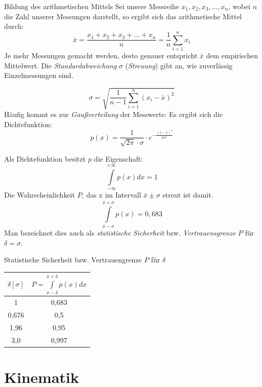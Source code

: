 \documentclass[a4paper,10pt]{scrartcl}
\begin{document}
\begin{seg}{Bildung des arithmetischen Mittels}
Sei unsere Messreihe $x_1, x_2, x_3, ..., x_n$, wobei $n$ die Zahl unserer Messungen darstellt, so ergibt sich das arithmetische Mittel durch:
\[
\boxed{\bar x = \frac{x_1+x_2+x_3+...+x_n}n=\frac{1}{n} \sum_{i=1}^{n} x_i}
\]
Je mehr Messungen gemacht werden, desto genauer entspricht $\bar x$ dem empirischen Mittelwert.  Die \emph{Standardabweichung} $\sigma$ (\emph{Streuung}) gibt an, wie zuverlässig Einzelmessungen sind.
\begin{figure}[h]
\end{figure}
\[
\boxed{\sigma=\sqrt{\frac 1 {n-1} \sum\limits_{i=1}^n (x_i-\bar x)^2}}
\]
Häufig kommt es zur \emph{Gaußverteilung} der Messwerte: Es ergibt sich die Dichtefunktion:
\[
\boxed{p(x)=\frac{1}{\sqrt{2\pi}\cdot \sigma} \cdot e^{-\frac{(x-\bar x)^2}{2\sigma^2}}}
\]
\begin{figure}[h]
\end{figure}
Als Dichtefunktion besitzt $p$ die Eigenschaft: 
\[
\int\limits_{-\infty}^{+\infty}p(x) dx = 1
\]
Die Wahrscheinlichkeit $P$, das x im Intervall $\bar x \pm \sigma$ streut ist damit. 
\[
\int\limits_{\bar x-\sigma}^{\bar x+\sigma} p(x)=0,683
\]
Man bezeichnet dies auch als \emph{statistische Sicherheit} bzw. \emph{Vertrauensgrenze} $P$ für $\delta=\sigma$.

\begin{seg}{Statistische Sicherheit bzw. Vertrauengrenze $P$ für $\delta$}
\begin{table}[h]
\begin{tabular}{c|c}
$\delta[\sigma]$ & $P=\int\limits_{\bar x-\delta}^{\bar x+\delta} p(x) dx$ \\ \hline
1 & 0,683 \\
0,676 & 0,5 \\
1,96 & 0,95 \\
3,0 & 0,997
\end{tabular}
\end{table}
\end{seg}
\end{seg}
\section{Kinematik}
\end{document}
